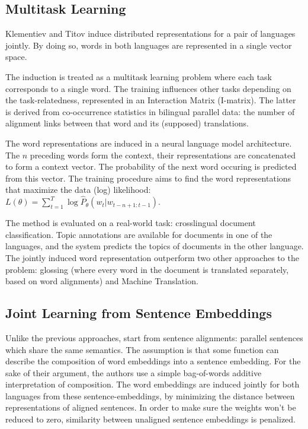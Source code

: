 \subsection{Multitask Learning}

Klementiev and Titov \cite{klementiev2012inducing} induce distributed representations for a pair of languages jointly. By doing so, words in both languages are represented in a single vector space.

The induction is treated as a multitask learning problem where each task corresponds to a single word. The training influences other tasks depending on the task-relatedness, represented in an Interaction Matrix (I-matrix). The latter is derived from co-occurrence statistics in bilingual parallel data: the number of alignment links between  that word and its (supposed) translations. 

The word representations are induced in a neural language model architecture. 
The $n$ preceding words form the context, their representations are concatenated to form a context vector. The probability of the next word occuring is predicted from this vector. The training procedure aims to find the word representations that maximize the data (log) likelihood: 
$L(\theta) = \sum_{t=1}^T \log \hat{P}_\theta (w_t|w_{t-n+1:t-1})$. 

The method is evaluated on a real-world task: crosslingual document classification. Topic annotations are available for documents in one of the languages, and the system predicts the topics of documents in the other language. The jointly induced word representation outperform two other approaches to the problem: glossing (where every word in the document is translated separately, based on word alignments) and Machine Translation.


\subsection{Joint Learning from Sentence Embeddings}

Unlike the previous approaches, \cite{hermann2013multilingual} start from sentence alignments: parallel sentences which share the same semantics.
The assumption is that some function can describe the composition of word embeddings into a sentence embedding.
For the sake of their argument, the authors use a simple bag-of-words additive interpretation of composition. 
The word embeddings are induced jointly for both languages from these sentence-embeddings, by minimizing the distance between representations of aligned sentences.
In order to make sure the weights won't be reduced to zero, similarity between unaligned sentence embeddings is penalized.

